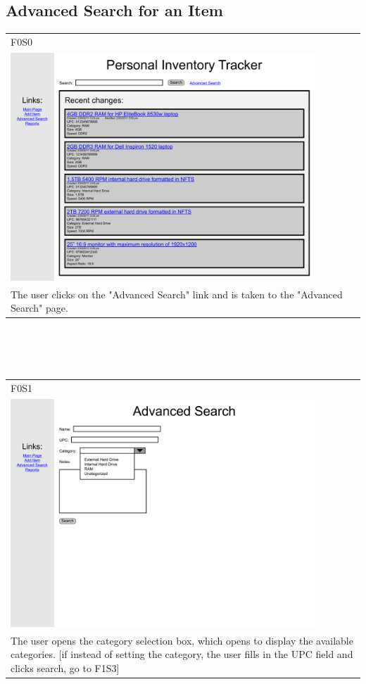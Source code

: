 \documentclass{article}
\begin{document}
\subsection{Advanced Search for an Item}
\begin{tabular}{ p{4.5in} }
F0S0\\
\includegraphics[keepaspectratio, width=4.5in]{advancedSearchF0S0.pdf} \\
The user clicks on the "Advanced Search" link and is taken to the "Advanced Search" page.
\end{tabular}\\
~\\
~\\
\begin{tabular}{ p{4.5in} }
F0S1\\
\includegraphics[keepaspectratio, width=4.5in]{advancedSearchF0S1.pdf} \\
The user opens the category selection box, which opens to display the available categories. [if instead of setting the category, the user fills in the UPC field and clicks search, go to F1S3]
\end{tabular}\\
\end{document}
